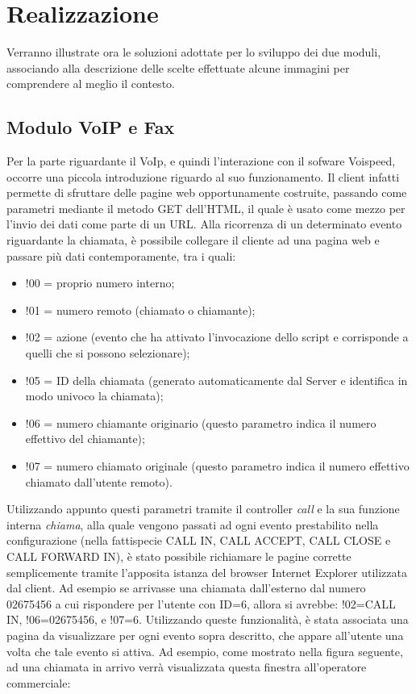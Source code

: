 \section{Realizzazione}
Verranno illustrate ora le soluzioni adottate per lo sviluppo dei due moduli, associando alla descrizione delle scelte effettuate 
alcune immagini per comprendere al meglio il contesto.
\subsection{Modulo VoIP e Fax}
Per la parte riguardante il VoIp, e quindi l'interazione con il sofware Voispeed, occorre una piccola introduzione riguardo al suo 
funzionamento. Il client infatti permette di sfruttare delle pagine web opportunamente costruite, passando come parametri mediante 
il metodo GET dell'HTML, il quale \`e usato come mezzo per l'invio dei dati come parte di un URL. 
Alla ricorrenza di un determinato evento riguardante la chiamata, \`e possibile collegare il cliente ad una pagina web e passare pi\`u
dati contemporamente, tra i quali:
\begin{itemize}
 \item !00 = proprio numero interno;
 \item !01 = numero remoto (chiamato o chiamante);
 \item !02 = azione (evento che ha attivato l'invocazione dello script e corrisponde a quelli che si possono selezionare);
 \item !05 = ID della chiamata (generato automaticamente dal Server e identifica in modo univoco la chiamata);
 \item !06 = numero chiamante originario (questo parametro indica il numero effettivo del chiamante);
 \item !07 = numero chiamato originale (questo parametro indica il numero effettivo chiamato dall'utente remoto).
\end{itemize}
  Utilizzando appunto questi parametri tramite il controller \textit{call} e la sua funzione interna \textit{chiama}, alla quale 
vengono passati ad ogni evento prestabilito nella configurazione (nella fattispecie CALL IN, CALL ACCEPT, CALL CLOSE e CALL FORWARD IN), 
\`e stato possibile richiamare le pagine corrette semplicemente tramite l'apposita istanza del browser Internet Explorer 
utilizzata dal client.
Ad esempio se arrivasse una chiamata dall'esterno dal numero 02675456 a cui rispondere per l'utente con ID=6, allora si avrebbe:
 !02=CALL IN, !06=02675456, e !07=6.
Utilizzando queste funzionalit\`a, \`e stata associata una pagina da visualizzare per ogni evento sopra descritto, che appare 
all'utente una volta che tale evento si attiva. Ad esempio, come mostrato nella figura seguente, ad una chiamata in arrivo verr\`a 
visualizzata questa finestra all'operatore commerciale:



